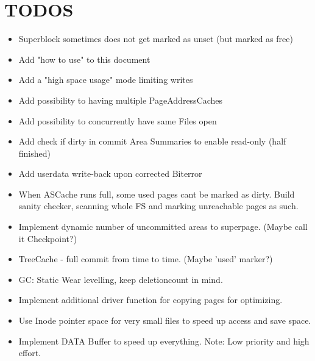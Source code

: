 \section{TODOS}
\begin{itemize}
    \item Superblock sometimes does not get marked as unset (but marked as free)
    \item Add "how to use" to this document
    \item Add a "high space usage" mode limiting writes 
    \item Add possibility to having multiple PageAddressCaches
    \item Add possibility to concurrently have same Files open
    \item Add check if dirty in commit Area Summaries to enable read-only (half finished)
    \item Add userdata write-back upon corrected Biterror
	\item When ASCache runs full, some used pages cant be marked as dirty. Build sanity checker, scanning whole FS and marking unreachable pages as such.
	\item Implement dynamic number of uncommitted areas to superpage. (Maybe call it Checkpoint?)
	\item TreeCache - full commit from time to time. (Maybe 'used' marker?)
	\item GC: Static Wear levelling, keep deletioncount in mind.
	\item Implement additional driver function for copying pages for optimizing.
	\item Use Inode pointer space for very small files to speed up access and save space.
	\item Implement DATA Buffer to speed up everything. Note: Low priority and high effort.
\end{itemize}
